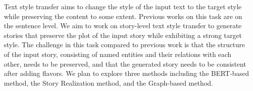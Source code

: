 Text style transfer aims to change the style of the input text to the target style while preserving the content to some extent. Previous works on this task are on the sentence level. We aim to work on story-level text style transfer to generate stories that preserve the plot of the input story while exhibiting a strong target style. The challenge in this task compared to previous work is that the structure of the input story, consisting of named entities and their relations with each other, needs to be preserved, and that the generated story needs to be consistent after adding flavors. We plan to explore three methods including the BERT-based method, the Story Realization method, and the Graph-based method.
